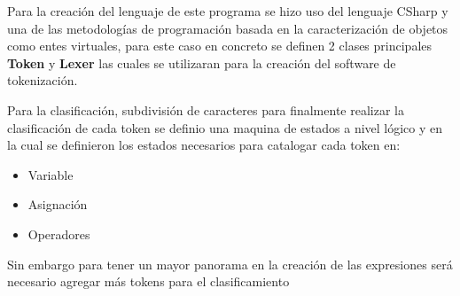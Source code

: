 \documentclass[conference]{IEEEtran}
\begin{document}
	Para la creación del lenguaje de este programa se hizo uso del lenguaje CSharp y una de las metodologías de programación basada en la caracterización de objetos como entes virtuales, para este caso en concreto se definen 2 clases principales \textbf{Token} y \textbf{Lexer} las cuales se utilizaran para la creación del software de tokenización.
	
	Para la clasificación, subdivisión de caracteres para finalmente realizar la clasificación de cada token se definio una maquina de estados a nivel lógico y en la cual se definieron los estados necesarios para catalogar cada token en:
	\begin{itemize}
		\item Variable
		\item Asignación
		\item Operadores
	\end{itemize}
	
	Sin embargo para tener un mayor panorama en la creación de las expresiones será necesario agregar más tokens para el clasificamiento
	
		
	
	
	
\end{document}
